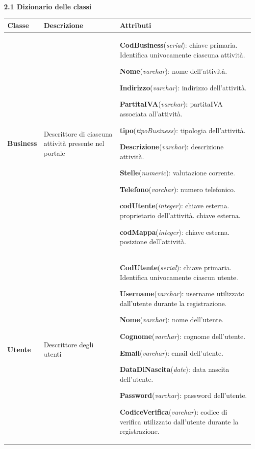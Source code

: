 \documentclass[a4paper,12pt]{article}
\begin{document}
\newpage\null{}\setcounter{page}{5}
\vspace{-2cm}
\begin{flushleft}
{\bf 2.1 Dizionario delle classi} 
\vspace{+1cm}
\begin{table}[htbp]
\begin{tabular}[c]{| m{3cm} | m{5cm} | m{7cm} |}
\hline
\bf Classe&\bf Descrizione&\bf Attributi\\
\hline
{\bf Business}
&\small Descrittore di ciascuna attività presente nel portale
&\footnotesize
{\bf CodBusiness}({\it serial}): chiave primaria. Identifica univocamente ciascuna attività.

{\bf Nome}({\it varchar}): nome dell'attività.

{\bf Indirizzo}({\it varchar}): indirizzo dell'attività.

{\bf PartitaIVA}({\it varchar}): partitaIVA associata all'attività.

{\bf tipo}({\it tipoBusiness}): tipologia dell'attività.

{\bf Descrizione}({\it varchar}): descrizione attività.

{\bf Stelle}({\it numeric}): valutazione corrente.

{\bf Telefono}({\it varchar}): numero telefonico.

{\bf codUtente}({\it integer}): chiave esterna. proprietario dell'attività. chiave esterna.

{\bf codMappa}({\it integer}): chiave esterna. posizione dell'attività. 
\\
\hline

{\bf Utente}
&\small Descrittore degli utenti 
&\footnotesize
{\bf CodUtente}({\it serial}): chiave primaria. Identifica univocamente ciascun utente.

{\bf Username}({\it varchar}): username utilizzato dall'utente durante la
registrazione.

{\bf Nome}({\it varchar}): nome dell'utente.

{\bf Cognome}({\it varchar}): cognome dell'utente.

{\bf Email}({\it varchar}): email dell'utente.

{\bf DataDiNascita}({\it date}): data nascita dell'utente.

{\bf Password}({\it varchar}): password dell'utente.

{\bf CodiceVerifica}({\it varchar}): codice di verifica
utilizzato dall'utente durante la registrazione.


\end{tabular}
\end{table}
\end{flushleft}
\end{document}
